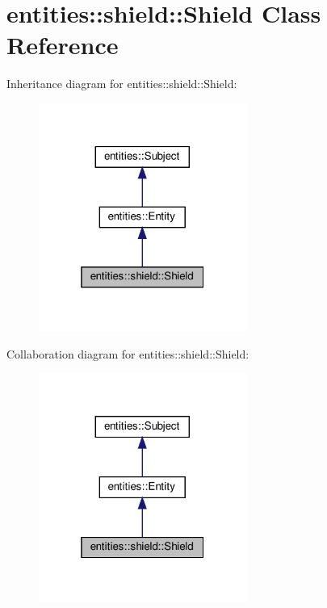 \hypertarget{classentities_1_1shield_1_1Shield}{}\section{entities\+:\+:shield\+:\+:Shield Class Reference}
\label{classentities_1_1shield_1_1Shield}


Inheritance diagram for entities\+:\+:shield\+:\+:Shield\+:\nopagebreak
\begin{figure}[H]
\begin{center}
\leavevmode
\includegraphics[width=193pt]{classentities_1_1shield_1_1Shield__inherit__graph}
\end{center}
\end{figure}


Collaboration diagram for entities\+:\+:shield\+:\+:Shield\+:\nopagebreak
\begin{figure}[H]
\begin{center}
\leavevmode
\includegraphics[width=193pt]{classentities_1_1shield_1_1Shield__coll__graph}
\end{center}
\end{figure}
